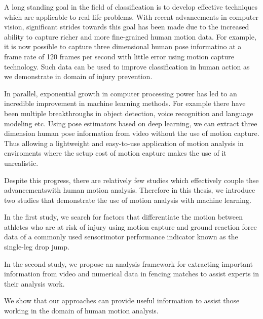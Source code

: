 A long standing goal in the field of classification is to develop effective techniques which are applicable to real life problems. With recent advancements in computer vision, significant strides towards this goal has been made due to the increased ability to capture richer and more fine-grained human motion data. For example, it is now possible to capture three dimensional human pose informatino at a frame rate of 120 frames per second with little error using motion capture technology. Such data can be used to improve classification in human action as we demonstrate in domain of injury prevention. 

In parallel, exponential growth in computer processing power has led to an incredible improvement in machine learning methods. For example there have been multiple breakthroughs in object detection, voice recognition and language modeling etc. Using pose estimators based on deep learning, we can extract three dimension human pose information from video without the use of motion capture. Thus allowing a lightweight and easy-to-use application of motion analysis in enviroments where the setup cost of motion capture makes the use of it unrealistic. 

Despite this progress, there are relatively few studies which effectively couple thse advancementswith human motion analysis. Therefore in this thesis, we introduce two studies that demonstrate the use of motion analysis with machine learning.

In the first study, we search for factors that differentiate the motion between athletes who are at risk of injury using motion capture and ground reaction force data of a commonly used sensorimotor performance indicator known as the single-leg drop jump.

In the second study, we propose an analysis framework for extracting important information from video and numerical data in fencing matches to assist experts in their analysis work. 

We show that our approaches can provide useful information to assist those working in the domain of human motion analysis. 